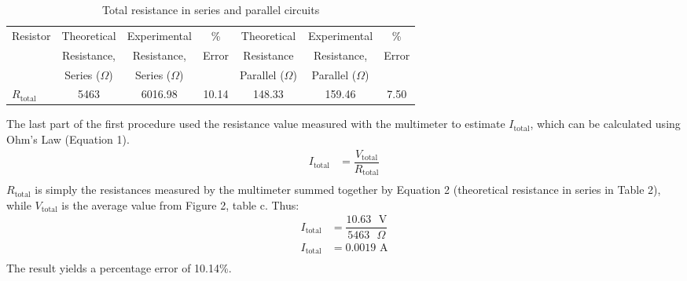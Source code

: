 \documentclass [12pt, letterpaper, twoside] {article}
\begin{document}
\begin{table}
  \centering
  \begin{tabular}{| l | c | c | c | c | c | c |}
    \hline\hline
    \multirow {3}{*}{Resistor} & Theoretical & Experimental & \% & Theoretical & Experimental & \% \\
    & Resistance, & Resistance, & Error & Resistance & Resistance, & Error \\
    & Series (\(\Omega\)) & Series (\(\Omega\)) & & Parallel (\(\Omega\)) & Parallel (\(\Omega\)) & \\
    \hline
    \(R_{\text{total}}\) & 5463 & 6016.98 & 10.14 & 148.33 & 159.46 & 7.50 \\ %
    \hline\hline
  \end{tabular}
  \caption{Total resistance in series and parallel circuits}
\end{table}

The last part of the first procedure used the resistance value measured with the multimeter to estimate \(I_{\text{total}}\), which can be calculated using Ohm's Law (Equation 1).
\begin{equation}
  \begin{split}
    I_{\text{total}} &= \dfrac{V_{\text{total}}}{R_{\text{total}}} \\
  \end{split}
\end{equation}
\(R_{\text{total}}\) is simply the resistances measured by the multimeter summed together by Equation 2 (theoretical resistance in series in Table 2), while \(V_{\text{total}}\) is the average value from Figure 2, table c. Thus:
\begin{equation*}
  \begin{split}
    I_{\text{total}} &= \dfrac{10.63\text{ }\text{V}}{5463\text{ }\Omega} \\
    I_{\text{total}} &= 0.0019\text{ A} \\ %
  \end{split}
\end{equation*}
The result yields a percentage error of 10.14\%. %
\end{document}
